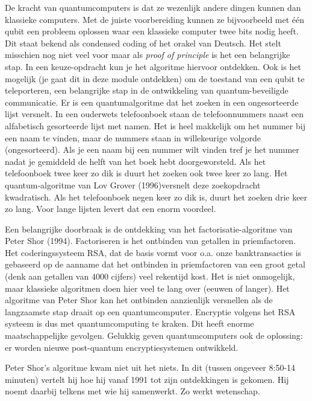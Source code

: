 \documentclass[../../main.tex]{subfiles}
\begin{document}
De kracht van quantumcomputers is dat ze wezenlijk andere dingen kunnen dan klassieke computers. Met de juiste voorbereiding kunnen ze bijvoorbeeld met \'e\'en qubit een probleem oplossen waar een klassieke computer twee bits nodig heeft. Dit staat bekend als condensed coding of het orakel van Deutsch. Het stelt misschien nog niet veel voor maar als \textit{proof of principle} is het een belangrijke stap. In een keuze-opdracht kun je het algoritme hiervoor ontdekken. Ook is het mogelijk (je gaat dit in deze module ontdekken) om de toestand van een qubit te teleporteren, een belangrijke stap in de ontwikkeling van quantum-beveiligde communicatie. Er is een quantumalgoritme dat het zoeken in een ongesorteerde lijst versnelt. In een ouderwets telefoonboek staan de telefoonnummers naast een alfabetisch gesorteerde lijst met namen. Het is heel makkelijk om het nummer bij een naam te vinden, maar de nummers staan in willekeurige volgorde (ongesorteerd). Als je een naam bij een nummer wilt vinden  tref je het nummer nadat je gemiddeld de helft van het boek hebt doorgeworsteld. Als het telefoonboek twee keer zo dik is duurt het zoeken ook twee keer zo lang. Het quantum-algoritme van Lov Grover (1996)versnelt deze zoekopdracht kwadratisch. Als het telefoonboek negen keer zo dik is, duurt het zoeken drie keer zo lang. Voor lange lijsten levert dat een enorm voordeel.

Een belangrijke doorbraak is de ontdekking van het factorisatie-algoritme van Peter Shor (1994). Factoriseren is het ontbinden van getallen in priemfactoren. Het coderingssysteem RSA, dat de basis vormt voor o.a. onze banktransacties is gebaseerd op de aanname dat het ontbinden in priemfactoren van een groot getal (denk aan getallen van 4000 cijfers) veel rekentijd kost. Het is niet onmogelijk, maar klassieke algoritmen doen hier veel te lang over (eeuwen of langer). Het algoritme van Peter Shor kan het ontbinden aanzienlijk versnellen als de langzaamste stap draait op een quantumcomputer. Encryptie volgens het RSA systeem is dus met quantumcomputing te kraken. Dit heeft enorme maatschappelijke gevolgen. Gelukkig geven quantumcomputers ook de oplossing: er worden nieuwe post-quantum encryptiesystemen ontwikkeld. 

Peter Shor's algoritme kwam niet uit het niets. In dit  (tussen ongeveer 8:50-14 minuten) vertelt hij hoe hij vanaf 1991 tot zijn ontdekkingen is gekomen. Hij noemt daarbij telkens met wie hij samenwerkt. Zo werkt wetenschap.
\end{document}
